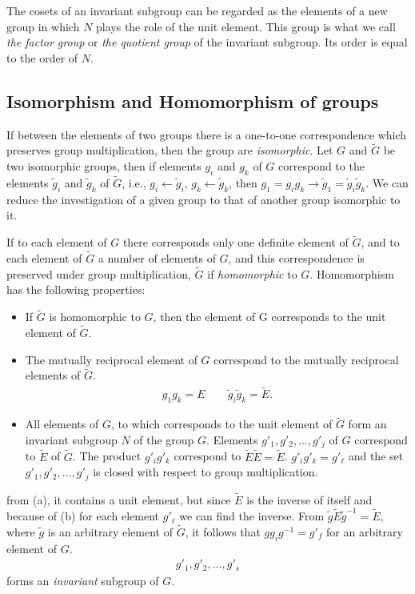 The cosets of an invariant subgroup can be regarded as the elements of a new
group in which $N$ plays the role of the unit element. This group is what we call
\emph{the factor group} or \emph{the quotient group} of the invariant subgroup.
Its order is equal to the order of $N$.


\subsection{Isomorphism and Homomorphism of groups} %
\label{sub:Isomorphism and Homomorphism of groups}

If between the elements of two groups there is a one-to-one correspondence which
preserves group multiplication, then the group are \emph{isomorphic}. Let $G$ and
$\widetilde{G}$ be two isomorphic groups, then if elements $g_i$ and $g_k$ of $G$
correspond to the elements $\widetilde{g}_i$ and $\widetilde{g}_k$ of
$\widetilde{G}$, i.e., $g_i\leftarrow\widetilde{g}_i$,
$g_k\leftarrow\widetilde{g}_k$, then
$g_1=g_ig_k\rightarrow\widetilde{g}_1=\widetilde{g}_i\widetilde{g}_k$. We can
reduce the investigation of a given group to that of another group isomorphic to
it.

If to each element of $G$ there corresponds only one definite element of
$\widetilde{G}$, and to each element of $\widetilde{G}$ a number of elements of
$G$, and this correspondence is preserved under group multiplication,
$\widetilde{G}$ if \emph{homomorphic} to $G$. Homomorphism has the following
properties:
\begin{itemize}
    \item If $\widetilde{G}$ is homomorphic to $G$, then the element of G
        corresponds to the unit element of $\widetilde{G}$.
    \item The mutually reciprocal element of $G$ correspond to the mutually
        reciprocal elements of $\widetilde{G}$.
        \begin{align}
            g_1g_k=E\qquad \widetilde{g}_i\widetilde{g}_k=\widetilde{E}.
        \end{align}
    \item All elements of $G$, to which corresponds to the unit element of
        $\widetilde{G}$ form an invariant subgroup $N$ of the group $G$. Elements
        $g'_1,g'_2,\dots,g'_j$ of $G$ correspond to $\widetilde{E}$ of
        $\widetilde{G}$. The product $g'_ig'_k$ correspond to
        $\widetilde{E}\widetilde{E}=\widetilde{E}$. $g'_ig'_k=g'_\ell$ and the
        set $g'_1,g'_2,\dots,g'_j$ is closed with respect to group multiplication.
\end{itemize}
from (a), it contains a unit element, but since $\widetilde{E}$ is the inverse
of itself and because of (b) for each element $g'_\ell$ we can find the inverse.
From $\widetilde{g}\widetilde{E}\widetilde{g}^{-1}=\widetilde{E}$, where
$\widetilde{g}$ is an arbitrary element of $\widetilde{G}$, it follows that
$gg_ig^{-1}=g'_f$ for an arbitrary element of $G$.
\begin{align}
    g'_1,g'_2,\dots,g'_s
\end{align}
forms an \emph{invariant} subgroup of $G$.


